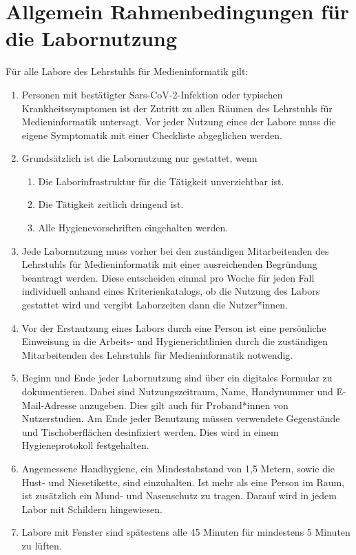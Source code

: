 \section{Allgemein Rahmenbedingungen für die Labornutzung}\label{sec:allgemein}

\noindent
Für alle Labore des Lehrstuhls für Medieninformatik gilt:

\begin{enumerate}
    \item{Personen mit bestätigter Sars-CoV-2-Infektion oder typischen Krankheitssymptomen ist der Zutritt zu allen Räumen des Lehrstuhls für Medieninformatik untersagt.
    Vor jeder Nutzung eines der Labore muss die eigene Symptomatik mit einer Checkliste abgeglichen werden.}
    \item Grundsätzlich ist die Labornutzung nur gestattet, wenn
    \begin{enumerate}
        \item Die Laborinfrastruktur für die Tätigkeit unverzichtbar ist.
        \item Die Tätigkeit zeitlich dringend ist.
        \item Alle Hygienevorschriften eingehalten werden.
    \end{enumerate}
    \item{Jede Labornutzung muss vorher bei den zuständigen Mitarbeitenden des Lehrstuhls für Medieninformatik mit einer ausreichenden Begründung beantragt werden.
    Diese entscheiden einmal pro Woche für jeden Fall individuell anhand eines Kriterienkatalogs, ob die Nutzung des Labors gestattet wird und vergibt Laborzeiten dann die Nutzer*innen.}
    \item{Vor der Erstnutzung eines Labors durch eine Person ist eine persönliche Einweisung in die Arbeits- und Hygienerichtlinien durch die zuständigen Mitarbeitenden des Lehrstuhls für Medieninformatik notwendig.}
    \item{Beginn und Ende jeder Labornutzung sind über ein digitales Formular zu dokumentieren.
    Dabei sind Nutzungszeitraum, Name, Handynummer und E-Mail-Adresse anzugeben.
    Dies gilt auch für Proband*innen von Nutzerstudien.
    Am Ende jeder Benutzung müssen verwendete Gegenstände und Tischoberflächen desinfiziert werden.
    Dies wird in einem Hygieneprotokoll festgehalten.}
    \item{Angemessene Handhygiene, ein Mindestabstand von 1,5 Metern, sowie die Hust- und Niesetikette, sind einzuhalten.
    Ist mehr als eine Person im Raum, ist zusätzlich ein Mund- und Nasenschutz zu tragen.
    Darauf wird in jedem Labor mit Schildern hingewiesen.}
    \item{Labore mit Fenster sind spätestens alle 45 Minuten für mindestens 5 Minuten zu lüften.}
\end{enumerate}
